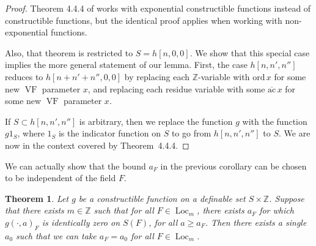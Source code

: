 \documentclass[12pt]{amsart}
\newcommand{\op}[1]{\operatorname{#1}}
\newcommand{\ring}[1]{{\mathbb #1}}
\def\VF{{\op{VF}}}
\newcommand\ord{\mathrm{ord}}
\newcommand\ac{\overline{\mathrm{ac}}}
\theoremstyle{plain}
\newtheorem{thm}{Theorem}
\theoremstyle{definition}
\begin{document}
\begin{proof}  Theorem 4.4.4 of \cite{CGH} works with exponential
  constructible functions instead of constructible functions, but the
  identical proof applies when working with non-exponential functions.

  Also, that theorem is restricted to $S=h[n,0,0]$.  We show that
  this special case implies the more general statement of our lemma.
  First, the case $h[n,n',n'']$ reduces to $h[n+n'+n'',0,0]$ by
  replacing each $\ring{Z}$-variable with $\ord\, x$ for some new $\VF$
  parameter $x$, and replacing each residue variable with some $\ac\, x$
  for some new $\VF$ parameter $x$.

  If $S\subset h[n,n',n'']$ is arbitrary, then we replace the function
  $g$ with the function $g 1_S$, where $1_S$ is the indicator function
  on $S$ to go from $h[n,n',n'']$ to $S$.  We are now in the context
  covered by Theorem~4.4.4.
\end{proof}


We can actually show that the bound $a_F$ in the previous corollary
can be chosen to be independent of the field $F$.

\begin{thm}
Let $g$ be a constructible function on a definable set $S\times\ring{Z}$.  Suppose
that there exists $m\in\ring{Z}$ such that for all $F\in \op{Loc}_m$, there
exists $a_F$ for which $g(\cdot,a)_F$ is identically zero on $S(F)$,
for all $a\ge a_F$.   Then there exists a single $a_0$ such that we
can take $a_F=a_0$ for all $F\in \op{Loc}_m$.
\end{thm}
\end{document}

